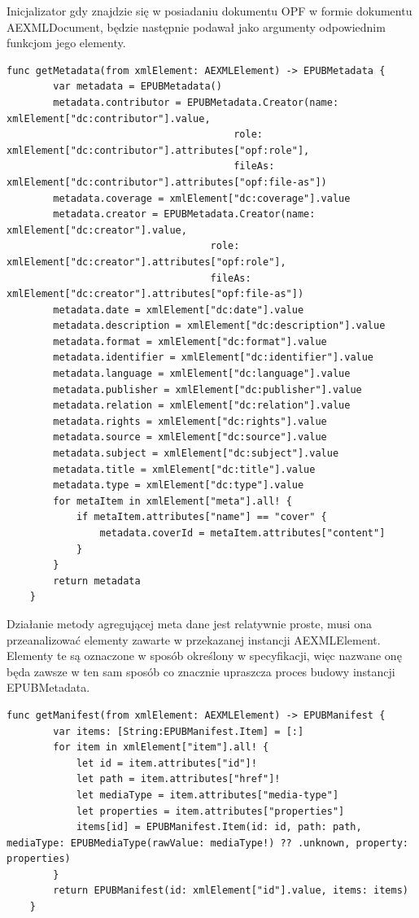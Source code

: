 Inicjalizator gdy znajdzie się w posiadaniu dokumentu OPF w formie dokumentu AEXMLDocument, będzie następnie podawał jako argumenty odpowiednim funkcjom jego elementy.

\begin{lstlisting}[caption={Implementacja metody getMetadata(from xmlElement:).},language=swift-reference]
    func getMetadata(from xmlElement: AEXMLElement) -> EPUBMetadata {
        var metadata = EPUBMetadata()
        metadata.contributor = EPUBMetadata.Creator(name: xmlElement["dc:contributor"].value,
                                       role: xmlElement["dc:contributor"].attributes["opf:role"],
                                       fileAs: xmlElement["dc:contributor"].attributes["opf:file-as"])
        metadata.coverage = xmlElement["dc:coverage"].value
        metadata.creator = EPUBMetadata.Creator(name: xmlElement["dc:creator"].value,
                                   role: xmlElement["dc:creator"].attributes["opf:role"],
                                   fileAs: xmlElement["dc:creator"].attributes["opf:file-as"])
        metadata.date = xmlElement["dc:date"].value
        metadata.description = xmlElement["dc:description"].value
        metadata.format = xmlElement["dc:format"].value
        metadata.identifier = xmlElement["dc:identifier"].value
        metadata.language = xmlElement["dc:language"].value
        metadata.publisher = xmlElement["dc:publisher"].value
        metadata.relation = xmlElement["dc:relation"].value
        metadata.rights = xmlElement["dc:rights"].value
        metadata.source = xmlElement["dc:source"].value
        metadata.subject = xmlElement["dc:subject"].value
        metadata.title = xmlElement["dc:title"].value
        metadata.type = xmlElement["dc:type"].value
        for metaItem in xmlElement["meta"].all! {
            if metaItem.attributes["name"] == "cover" {
                metadata.coverId = metaItem.attributes["content"]
            }
        }
        return metadata
    }
\end{lstlisting}

Działanie metody agregującej meta dane jest relatywnie proste, musi ona przeanalizować elementy zawarte w przekazanej instancji AEXMLElement. Elementy te są oznaczone w sposób określony w specyfikacji, więc nazwane onę będa zawsze w ten sam sposób co znacznie upraszcza proces budowy instancji EPUBMetadata.

\begin{lstlisting}[caption={Implementacja metody getManifest(from xmlElement:).},language=swift-reference]
    func getManifest(from xmlElement: AEXMLElement) -> EPUBManifest {
        var items: [String:EPUBManifest.Item] = [:]
        for item in xmlElement["item"].all! {
            let id = item.attributes["id"]!
            let path = item.attributes["href"]!
            let mediaType = item.attributes["media-type"]
            let properties = item.attributes["properties"]
            items[id] = EPUBManifest.Item(id: id, path: path, mediaType: EPUBMediaType(rawValue: mediaType!) ?? .unknown, property: properties)
        }
        return EPUBManifest(id: xmlElement["id"].value, items: items)
    }
\end{lstlisting}

